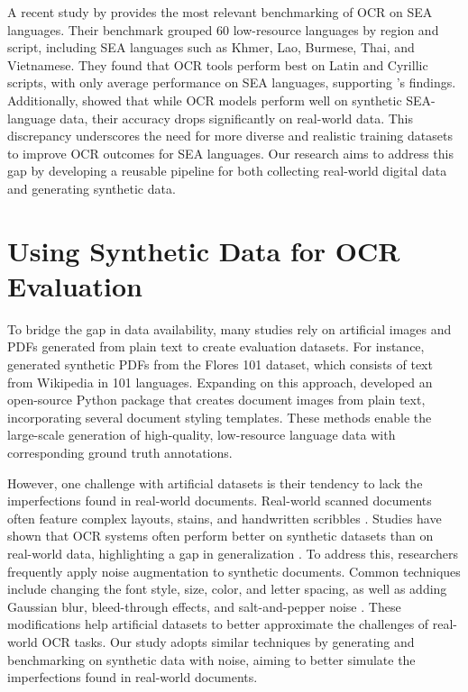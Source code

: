 \documentclass[12pt,oneside]{memoir}
\begin{document}
A recent study by \textcite{ignat-etal-2022} provides the most relevant benchmarking of OCR on SEA languages.
Their benchmark grouped 60 low-resource languages by region and script, including SEA languages such as Khmer, Lao, Burmese, Thai, and Vietnamese.
They found that OCR tools perform best on Latin and Cyrillic scripts, with only average performance on SEA languages, supporting \textcite{hegghammer-2022}'s findings.
Additionally, \textcite{ignat-etal-2022} showed that while OCR models perform well on synthetic SEA-language data, their accuracy drops significantly on real-world data.
This discrepancy underscores the need for more diverse and realistic training datasets to improve OCR outcomes for SEA languages.
Our research aims to address this gap by developing a reusable pipeline for both collecting real-world digital data and generating synthetic data.

\section{Using Synthetic Data for OCR Evaluation}

To bridge the gap in data availability, many studies rely on artificial images and PDFs generated from plain text to create evaluation datasets.
For instance, \textcite{ignat-etal-2022} generated synthetic PDFs from the Flores 101 dataset, which consists of text from Wikipedia in 101 languages.
Expanding on this approach, \textcite{gupte-etal-2021} developed an open-source Python package that creates document images from plain text, incorporating several document styling templates.
These methods enable the large-scale generation of high-quality, low-resource language data with corresponding ground truth annotations.

However, one challenge with artificial datasets is their tendency to lack the imperfections found in real-world documents. 
Real-world scanned documents often feature complex layouts, stains, and handwritten scribbles \parencite{hegghammer-2022}. 
Studies have shown that OCR systems often perform better on synthetic datasets than on real-world data, highlighting a gap in generalization \parencite{ignat-etal-2022}.
To address this, researchers frequently apply noise augmentation to synthetic documents. 
Common techniques include changing the font style, size, color, and letter spacing, as well as adding Gaussian blur, bleed-through effects, and salt-and-pepper noise \parencite{gupte-etal-2021, ignat-etal-2022}.
These modifications help artificial datasets to better approximate the challenges of real-world OCR tasks.
Our study adopts similar techniques by generating and benchmarking on synthetic data with noise, aiming to better simulate the imperfections found in real-world documents.
\end{document}
